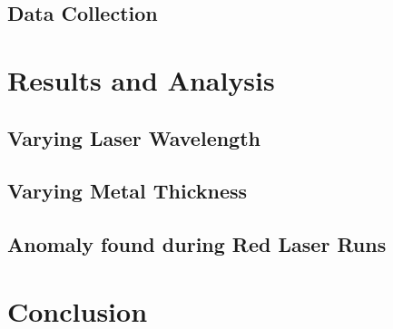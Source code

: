 \documentclass[%
reprint,
amsmath,amssymb,
aps,
]{revtex4-2}
\begin{document}
		\subsection{Data Collection}
			\subsubsection{}
		
		
	
	\section{Results and Analysis}
		\subsection{Varying Laser Wavelength}
		
		\subsection{Varying Metal Thickness}
	
		\subsection{Anomaly found during Red Laser Runs}

	\section{Conclusion}
		
		
	\newpage
		
	\newpage
	\appendix
		
		
\end{document}
